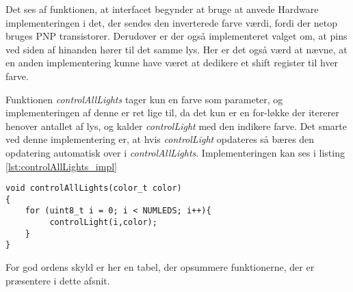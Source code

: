 \documentclass[Softwaredesign/Softwaredesign_main.tex]{subfiles}
\begin{document}
Det ses af funktionen, at interfacet begynder at bruge at anvede Hardware implementeringen i det, der sendes den inverterede farve værdi, fordi der netop bruges PNP transistorer. Derudover er der også implementeret valget om, at pins ved siden af hinanden hører til det samme lys. Her er det også værd at nævne, at en anden implementering kunne have været at dedikere et shift register til hver farve.

Funktionen \textit{controlAllLights} tager kun en farve som parameter, og implementeringen af denne er ret lige til, da det kun er en for-løkke der itererer henover antallet af lys, og kalder \textit{controlLight} med den indikere farve. Det smarte ved denne implementering er, at hvis \textit{controlLight} opdateres så bæres den opdatering automatisk over i \textit{controlAllLights}.  Implementeringen kan ses i listing \ref{lst:controlAllLights_impl}

\begin{lstlisting}[caption={Implementeringen af controlAllLights}, label={lst:controlAllLights_impl},
style=customc]
void controlAllLights(color_t color)
{
    for (uint8_t i = 0; i < NUMLEDS; i++){
         controlLight(i,color);
    }
}
\end{lstlisting}

For god ordens skyld er her en tabel, der opsummere funktionerne, der er præsentere i dette afsnit.
\end{document}
